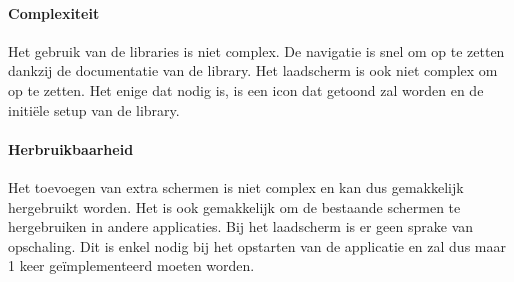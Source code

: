 \paragraph{Complexiteit}
Het gebruik van de libraries is niet complex. De navigatie is snel om op te zetten dankzij de documentatie van de library.
Het laadscherm is ook niet complex om op te zetten. Het enige dat nodig is, is een icon dat getoond zal worden en de 
initiële setup van de library. 

\paragraph{Herbruikbaarheid}
Het toevoegen van extra schermen is niet complex en kan dus gemakkelijk hergebruikt worden. Het is ook gemakkelijk om de
bestaande schermen te hergebruiken in andere applicaties. Bij het laadscherm is er geen sprake van opschaling. Dit is enkel
nodig bij het opstarten van de applicatie en zal dus maar 1 keer geïmplementeerd moeten worden.
